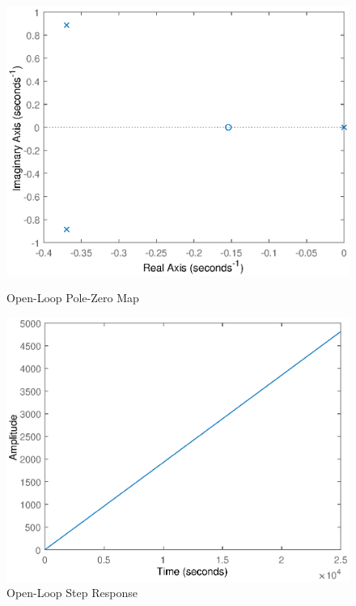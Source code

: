 \documentclass{article}
\begin{document}
    \begin{figure}[ht]
        \centering
        \begin{minipage}{.5\textwidth}
            \includegraphics[scale=.5]{OpenLoopPoles.eps}
            \caption{Open-Loop Pole-Zero Map}
            \label{fig:OpenLoopPoles}
        \end{minipage}%
        \begin{minipage}{.5\textwidth}
            \includegraphics[scale=.5]{OpenLoopResponse.eps}
            \caption{Open-Loop Step Response}
            \label{fig:OpenLoopResponse}
        \end{minipage}
    \end{figure}
\end{document}
